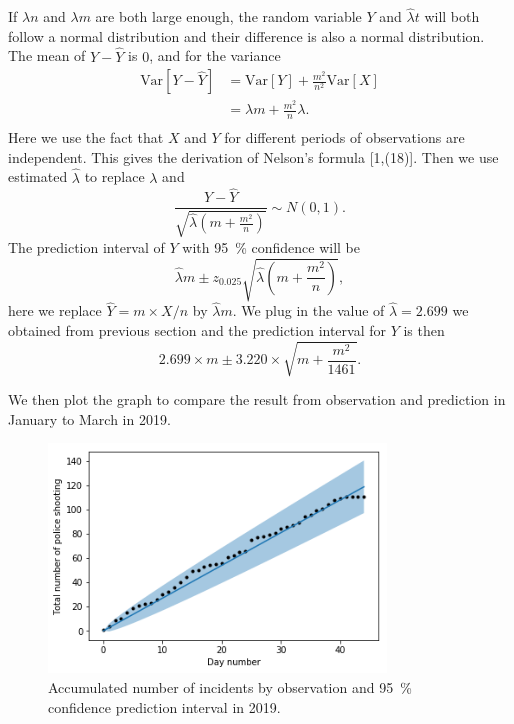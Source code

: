 \documentclass[11pt,a4paper,english]{article}
\begin{document}
If $\lambda n$ and $\lambda m$ are both large enough, the random variable $Y$ and $\hat{\lambda}t$ will both follow a normal distribution and their difference is also a normal distribution.
The mean of $Y-\hat{Y}$ is $0$, and for the variance
\begin{align*}
	\text{Var}[Y-\hat{Y}] &= \text{Var}[Y]+\frac{m^{2}}{n^{2}}\text{Var}[X]\\
	&= \lambda m+\frac{m^{2}}{n}\lambda.\\
\end{align*}
Here we use the fact that $X$ and $Y$ for different periods of observations are independent.
This gives the derivation of Nelson's formula [1,(18)].
Then we use estimated $\hat{\lambda}$ to replace $\lambda$ and 
\begin{equation*}
	\frac{Y-\hat{Y}}{\sqrt{\hat{\lambda}\left(m+\frac{m^{2}}{n}\right)}} \sim N(0,1).
\end{equation*}
The prediction interval of $Y$ with \SI{95}{\percent} confidence will be 
\begin{equation*}
	\hat{\lambda}m \pm z_{0.025}\sqrt{\hat{\lambda}\left(m+\frac{m^{2}}{n}\right)},
\end{equation*}
here we replace $\hat{Y} = m \times X/n$ by $\hat{\lambda}m$. We plug in the value of $\hat{\lambda} = 2.699$ we obtained from previous section and the prediction interval for $Y$ is then 
\begin{equation*}
	2.699 \times m \pm 3.220 \times \sqrt{m+\frac{m^{2}}{1461}}.
\end{equation*} 

We then plot the graph to compare the result from observation and prediction in January to March in 2019.
\begin{figure}[htbp]
	\centering
	\includegraphics[width=0.8\textwidth]{predict}
	\caption{Accumulated number of incidents by observation and \SI{95}{\percent} confidence prediction interval in 2019.}
	\label{fig:predict}
\end{figure}
\end{document}

